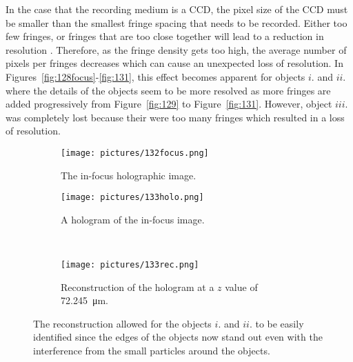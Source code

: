 In the case that the recording medium is a CCD, the pixel size of the CCD must
be smaller than the smallest fringe spacing that needs to be recorded. Either
too few fringes, or fringes that are too close together will lead to a
reduction in resolution \cite{Jericho}. Therefore, as the fringe density gets
too high, the average number of pixels per fringes decreases which can cause
an unexpected loss of resolution. In Figures~\ref{fig:128focus}-\ref{fig:131},
this effect becomes apparent for objects $i.$ and $ii.$ where the details of the objects
seem to be more resolved as more fringes are added progressively from
Figure~\ref{fig:129} to Figure~\ref{fig:131}. However, object $iii.$ was
completely lost because their were too many fringes which resulted in a loss of
resolution.



\begin{figure}[ht!]
    \begin{center}

        \begin{subfigure}[t]{0.4\textwidth}
            \label{fig:132focus}
            \texttt{[image: pictures/132focus.png]}
            \caption{The in-focus holographic image.}
        \end{subfigure}
                \hspace*{\fill}
        \begin{subfigure}[t]{0.4\textwidth}
            \label{fig:133holo}
            \texttt{[image: pictures/133holo.png]}
            \caption{A hologram of the in-focus image.}%
        \end{subfigure}
        \\
        \begin{subfigure}[t]{\textwidth}
            \label{fig:133rec}
            \texttt{[image: pictures/133rec.png]}
            \caption{Reconstruction of the hologram at a $z$ value of \SI{72.245}{\micro\meter}.}
        \end{subfigure}


    \end{center}
    \caption{%
       The reconstruction allowed for the objects $i.$ and $ii.$ to be easily
       identified since the edges of the objects now
       stand out even with the interference from the small particles around
       the objects.
    }%
    \label{fig:133}
\end{figure}

